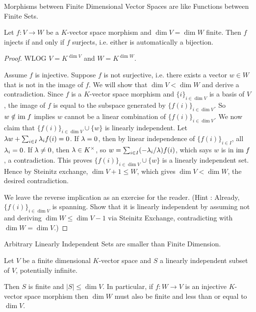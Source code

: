 \documentclass[../../book.tex]{subfiles}
\begin{document}
\begin{cor} Morphisms between Finite Dimensional Vector Spaces 
are like Functions between Finite Sets. 

    Let $f : V \to W$ be a $K$-vector space morphism and $\dim V = \dim W$ finite.
    Then $f$ injects if and only if $f$ surjects, i.e.
    either is automatically a bijection. 
\end{cor}
\begin{proof}
    WLOG $V = K^{\dim V}$ and $W = K^{\dim W}$. 

    Assume $f$ is injective. 
    Suppose $f$ is not surjective, i.e.
    there exists a vector $w \in W$ that is not in the image of $f$. 
    We will show that $\dim V < \dim W$ and derive a contradiction. 
    Since $f$ is a $K$-vector space morphism and 
    $\{i\}_{i\in\dim V}$ is a basis of $V$, 
    the image of $f$ is equal to the subspace generated by $\{f(i)\}_{i\in\dim V}$.
    So $w \notin \textnormal{im}\; f$ implies 
    $w$ cannot be a linear combination of $\{f(i)\}_{i\in\dim V}$.
    We now claim that $\{f(i)\}_{i\in\dim V} \cup \{w\}$ is linearly independent. 
    Let $\lambda w + \sum_{i\in I} \lambda_i f(i) = 0$. 
    If $\lambda = 0$, then by linear independence of $\{f(i)\}_{i\in I}$, all $\lambda_i = 0$. If $\lambda \neq 0$, then $\lambda \in K^\times$,
    so $w = \sum_{i\in I} (-\lambda_i/\lambda)f(i)$, 
    which says $w$ is in $\textnormal{im}\; f$, a contradiction. 
    This proves $\{f(i)\}_{i\in\dim V} \cup \{w\}$ is a linearly independent set.
    Hence by Steinitz exchange, $\dim V + 1 \leq W$,
    which gives $\dim V < \dim W$, the desired contradiction. 
    
    We leave the reverse implication as an exercise for the reader. 
    (Hint : Already, $\{f(i)\}_{i\in\dim V}$ is spanning. 
    Show that it is linearly independent by assuming not and 
    deriving $\dim W \leq \dim V - 1$ via Steinitz Exchange, 
    contradicting with $\dim W = \dim V$.)
\end{proof}
\begin{cor} Arbitrary Linearly Independent Sets are smaller than Finite Dimension.
    
    Let $V$ be a finite dimensional $K$-vector space and
    $S$ a linearly independent subset of $V$, potentially infinite.
    
    Then $S$ is finite and $|S| \leq \dim V$. 
    In particular, if $f : W \to V$ is an injective $K$-vector space morphism
    then $\dim W$ must also be finite and less than or equal to $\dim V$.
\end{cor}
\end{document}
